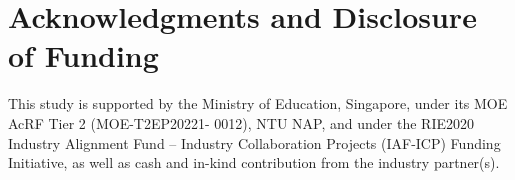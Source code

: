 \section{Acknowledgments and Disclosure of Funding}
This study is supported by the Ministry of Education, Singapore, under its MOE AcRF Tier 2 (MOE-T2EP20221- 0012), NTU NAP, and under the RIE2020 Industry Alignment Fund – Industry Collaboration Projects (IAF-ICP) Funding Initiative, as well as cash and in-kind contribution from the industry partner(s).
